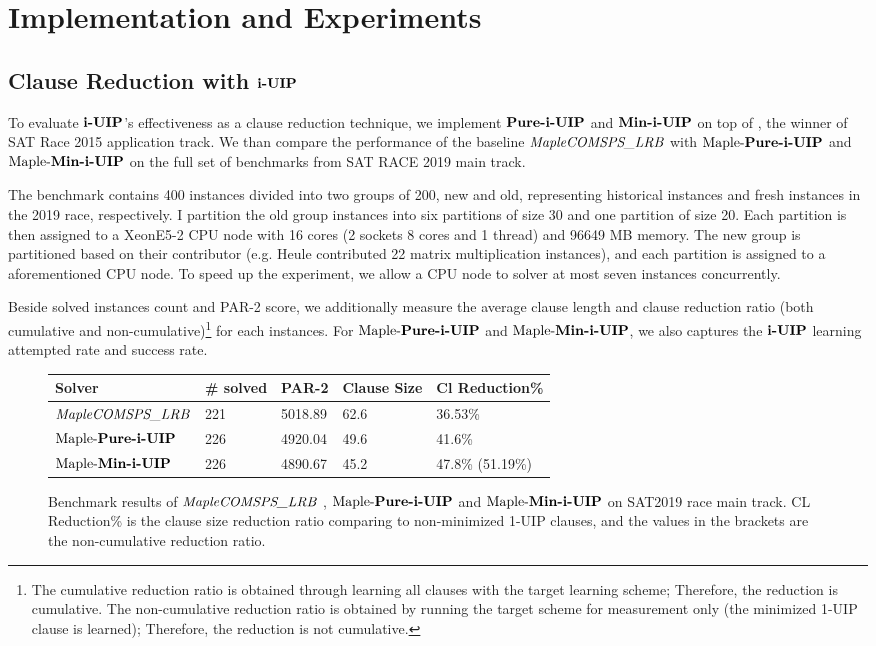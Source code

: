 \section{Implementation and Experiments}

\subsection{Clause Reduction with $\textbf{i-UIP}$}
To evaluate $\textbf{i-UIP}$'s effectiveness as a clause reduction technique, we implement  $\textbf{Pure-i-UIP}$ and $\textbf{Min-i-UIP}$  on top of \text{\MapleBase} \cite{}, the winner of SAT Race 2015 application track.  We than compare the performance of the baseline $\textit{MapleCOMSPS\_LRB}$ with $\text{Maple-\textbf{Pure-i-UIP}}$ and $\text{Maple-\textbf{Min-i-UIP}}$ on the full set of benchmarks from SAT RACE 2019 main track.

The benchmark contains 400 instances divided into two groups of 200, new and old, representing historical instances and fresh instances in the 2019 race, respectively. I partition the old group instances into six partitions of size 30 and one partition of size 20. Each partition is then assigned to a XeonE5-2 CPU node with 16 cores (2 sockets 8 cores  and  1 thread) and 96649 MB memory. The new group is partitioned based on their contributor (e.g. Heule contributed 22 matrix multiplication instances), and each partition is assigned to a aforementioned CPU node. To speed up the experiment, we allow a CPU node to solver at most seven instances concurrently. 

Beside solved instances count and PAR-2 score, we additionally measure the average clause length and clause reduction ratio (both cumulative and non-cumulative)\footnote{The cumulative reduction ratio is obtained through learning all clauses with the target learning scheme; Therefore, the reduction is cumulative. The non-cumulative reduction ratio is obtained by running the target scheme for measurement only (the minimized 1-UIP clause is learned); Therefore, the reduction is not cumulative. }  for each instances. For $\text{Maple-\textbf{Pure-i-UIP}}$  and $\text{Maple-\textbf{Min-i-UIP}}$, we also captures the $\textbf{i-UIP}$ learning attempted rate and success rate.

\begin{figure} 
\begin{center}
\begin{tabular}{ | m{3.5cm} | m{2cm}| m{2cm} | m{2cm} | m{2.5cm} | } 
\hline
Solver & \# solved & PAR-2 & Clause Size & Cl Reduction\% \\ 
\hline
$\textit{MapleCOMSPS\_LRB}$ & 221 & 5018.89 & 62.6 & 36.53\% \\ 
\hline
$\text{Maple-\textbf{Pure-i-UIP}}$ & 226 & 4920.04 & 49.6 & 41.6\% \\ 
\hline
$\text{Maple-\textbf{Min-i-UIP}}$ & 226 & 4890.67 & 45.2 & 47.8\%  (51.19\%)\\ 
\hline
\end{tabular}
\end{center}
\caption{Benchmark results of $\textit{MapleCOMSPS\_LRB}$ , $\text{Maple-\textbf{Pure-i-UIP}}$  and $\text{Maple-\textbf{Min-i-UIP}}$ on SAT2019 race main track.
CL Reduction\% is the clause size reduction ratio comparing to non-minimized 1-UIP clauses, and the values in the brackets are the non-cumulative reduction ratio.}
\label{fig:t1}
\end{figure}

